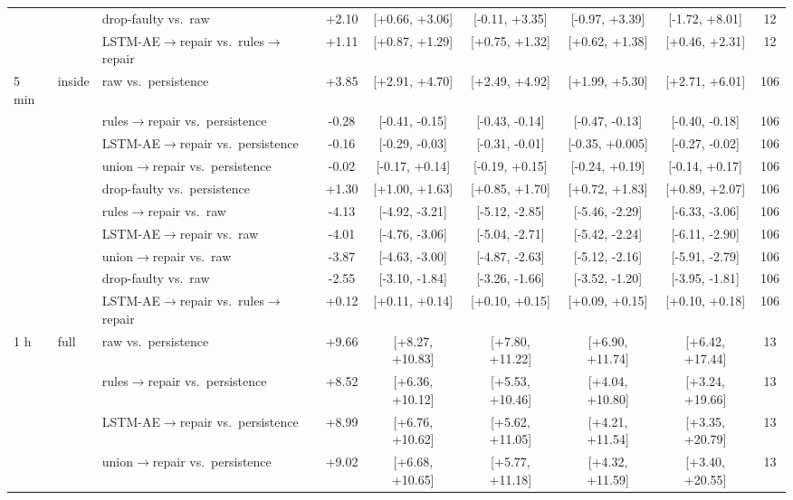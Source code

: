 \begin{longtable}{lllcccccc}
 &  & drop-faulty vs.\ raw & +2.10 & [+0.66, +3.06] & [-0.11, +3.35] & [-0.97, +3.39] & [-1.72, +8.01] & 12 \\
 &  & LSTM-AE$\rightarrow$repair vs.\ rules$\rightarrow$repair & +1.11 & [+0.87, +1.29] & [+0.75, +1.32] & [+0.62, +1.38] & [+0.46, +2.31] & 12 \\
\midrule
5 min & inside & raw vs.\ persistence & +3.85 & [+2.91, +4.70] & [+2.49, +4.92] & [+1.99, +5.30] & [+2.71, +6.01] & 106 \\
 &  & rules$\rightarrow$repair vs.\ persistence & -0.28 & [-0.41, -0.15] & [-0.43, -0.14] & [-0.47, -0.13] & [-0.40, -0.18] & 106 \\
 &  & LSTM-AE$\rightarrow$repair vs.\ persistence & -0.16 & [-0.29, -0.03] & [-0.31, -0.01] & [-0.35, +0.005] & [-0.27, -0.02] & 106 \\
 &  & union$\rightarrow$repair vs.\ persistence & -0.02 & [-0.17, +0.14] & [-0.19, +0.15] & [-0.24, +0.19] & [-0.14, +0.17] & 106 \\
 &  & drop-faulty vs.\ persistence & +1.30 & [+1.00, +1.63] & [+0.85, +1.70] & [+0.72, +1.83] & [+0.89, +2.07] & 106 \\
 &  & rules$\rightarrow$repair vs.\ raw & -4.13 & [-4.92, -3.21] & [-5.12, -2.85] & [-5.46, -2.29] & [-6.33, -3.06] & 106 \\
 &  & LSTM-AE$\rightarrow$repair vs.\ raw & -4.01 & [-4.76, -3.06] & [-5.04, -2.71] & [-5.42, -2.24] & [-6.11, -2.90] & 106 \\
 &  & union$\rightarrow$repair vs.\ raw & -3.87 & [-4.63, -3.00] & [-4.87, -2.63] & [-5.12, -2.16] & [-5.91, -2.79] & 106 \\
 &  & drop-faulty vs.\ raw & -2.55 & [-3.10, -1.84] & [-3.26, -1.66] & [-3.52, -1.20] & [-3.95, -1.81] & 106 \\
 &  & LSTM-AE$\rightarrow$repair vs.\ rules$\rightarrow$repair & +0.12 & [+0.11, +0.14] & [+0.10, +0.15] & [+0.09, +0.15] & [+0.10, +0.18] & 106 \\
\midrule
1 h & full & raw vs.\ persistence & +9.66 & [+8.27, +10.83] & [+7.80, +11.22] & [+6.90, +11.74] & [+6.42, +17.44] & 13 \\
 &  & rules$\rightarrow$repair vs.\ persistence & +8.52 & [+6.36, +10.12] & [+5.53, +10.46] & [+4.04, +10.80] & [+3.24, +19.66] & 13 \\
 &  & LSTM-AE$\rightarrow$repair vs.\ persistence & +8.99 & [+6.76, +10.62] & [+5.62, +11.05] & [+4.21, +11.54] & [+3.35, +20.79] & 13 \\
 &  & union$\rightarrow$repair vs.\ persistence & +9.02 & [+6.68, +10.65] & [+5.77, +11.18] & [+4.32, +11.59] & [+3.40, +20.55] & 13 \\

\end{longtable}
